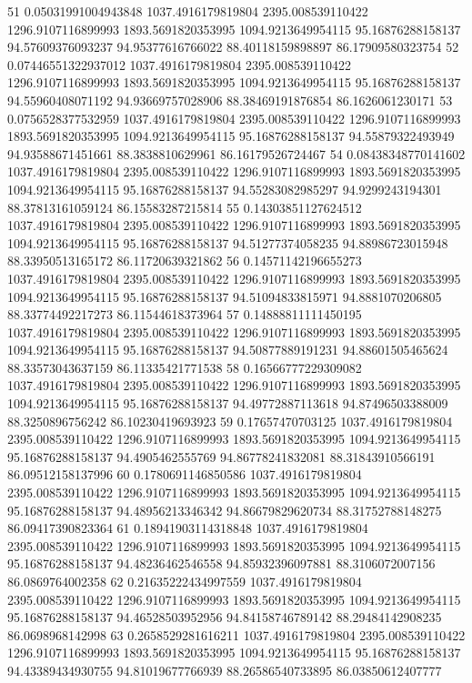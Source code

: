 {51 0.05031991004943848 1037.4916179819804 2395.008539110422 1296.9107116899993 1893.5691820353995 1094.9213649954115 95.16876288158137 94.57609376093237 94.95377616766022 88.40118159898897 86.17909580323754
52 0.07446551322937012 1037.4916179819804 2395.008539110422 1296.9107116899993 1893.5691820353995 1094.9213649954115 95.16876288158137 94.55960408071192 94.93669757028906 88.38469191876854 86.1626061230171
53 0.0756528377532959 1037.4916179819804 2395.008539110422 1296.9107116899993 1893.5691820353995 1094.9213649954115 95.16876288158137 94.55879322493949 94.93588671451661 88.3838810629961 86.16179526724467
54 0.08438348770141602 1037.4916179819804 2395.008539110422 1296.9107116899993 1893.5691820353995 1094.9213649954115 95.16876288158137 94.55283082985297 94.9299243194301 88.37813161059124 86.15583287215814
55 0.14303851127624512 1037.4916179819804 2395.008539110422 1296.9107116899993 1893.5691820353995 1094.9213649954115 95.16876288158137 94.51277374058235 94.88986723015948 88.33950513165172 86.11720639321862
56 0.14571142196655273 1037.4916179819804 2395.008539110422 1296.9107116899993 1893.5691820353995 1094.9213649954115 95.16876288158137 94.51094833815971 94.8881070206805 88.33774492217273 86.11544618373964
57 0.14888811111450195 1037.4916179819804 2395.008539110422 1296.9107116899993 1893.5691820353995 1094.9213649954115 95.16876288158137 94.50877889191231 94.88601505465624 88.33573043637159 86.11335421771538
58 0.16566777229309082 1037.4916179819804 2395.008539110422 1296.9107116899993 1893.5691820353995 1094.9213649954115 95.16876288158137 94.49772887113618 94.87496503388009 88.3250896756242 86.10230419693923
59 0.17657470703125 1037.4916179819804 2395.008539110422 1296.9107116899993 1893.5691820353995 1094.9213649954115 95.16876288158137 94.4905462555769 94.86778241832081 88.31843910566191 86.09512158137996
60 0.1780691146850586 1037.4916179819804 2395.008539110422 1296.9107116899993 1893.5691820353995 1094.9213649954115 95.16876288158137 94.48956213346342 94.86679829620734 88.31752788148275 86.09417390823364
61 0.18941903114318848 1037.4916179819804 2395.008539110422 1296.9107116899993 1893.5691820353995 1094.9213649954115 95.16876288158137 94.48236462546558 94.85932396097881 88.3106072007156 86.0869764002358
62 0.21635222434997559 1037.4916179819804 2395.008539110422 1296.9107116899993 1893.5691820353995 1094.9213649954115 95.16876288158137 94.46528503952956 94.84158746789142 88.29484142908235 86.0698968142998
63 0.2658529281616211 1037.4916179819804 2395.008539110422 1296.9107116899993 1893.5691820353995 1094.9213649954115 95.16876288158137 94.43389434930755 94.81019677766939 88.26586540733895 86.03850612407777
}
